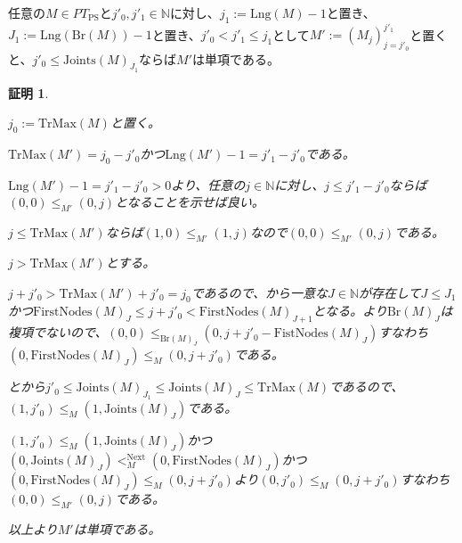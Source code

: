\documentclass[dvipdfmx,uplatex]{jsarticle}
\theoremstyle{customnonumberbreakfortheorem}
\theoremstyle{customnonumberbreakforproof}
\newtheorem{hideableproof}{証明}
\begin{document}
\begin{corollary}[単項性の切片への遺伝性]\label{単項性の切片への遺伝性}
	任意の\(M \in PT_{\textrm{PS}}\)と\(j'_0,j'_1 \in \mathbb{N}\)に対し、\(j_1 := \textrm{Lng}(M)-1\)と置き、\(J_1 := \textrm{Lng}(\textrm{Br}(M))-1\)と置き、\(j'_0 < j'_1 \leq j_1\)として\(M' := (M_j)_{j=j'_0}^{j'_1}\)と置くと、\(j'_0 \leq \textrm{Joints}(M)_{J_1}\)ならば\(M'\)は単項である。
\end{corollary}

\begin{hideableproof}
	\begin{indented}
		\item \(j_0 := \textrm{TrMax}(M)\)と置く。
		\item \(\textrm{TrMax}(M') = j_0-j'_0\)かつ\(\textrm{Lng}(M')-1 = j'_1-j'_0\)である。
		\item \(\textrm{Lng}(M')-1 = j'_1-j'_0 > 0\)より、任意の\(j \in \mathbb{N}\)に対し、\(j \leq j'_1-j'_0\)ならば\((0,0) \leq_{M'} (0,j)\)となることを示せば良い。
		\item \(j \leq \textrm{TrMax}(M')\)ならば\((1,0) \leq_{M'} (1,j)\)なので\((0,0) \leq_{M'} (0,j)\)である。
		\item \(j > \textrm{TrMax}(M')\)とする。
		\begin{indented}
			\item \(j+j'_0 > \textrm{TrMax}(M')+j'_0 = j_0\)であるので、から一意な\(J \in \mathbb{N}\)が存在して\(J \leq J_1\)かつ\(\textrm{FirstNodes}(M)_J \leq j+j'_0 < \textrm{FirstNodes}(M)_{J+1}\)となる。より\(\textrm{Br}(M)_J\)は複項でないので、\((0,0) \leq_{\textrm{Br}(M)_J} (0,j+j'_0 - \textrm{FistNodes}(M)_J)\)すなわち\((0,\textrm{FirstNodes}(M)_J) \leq_M (0,j+j'_0)\)である。
			\item {}とから\(j'_0 \leq \textrm{Joints}(M)_{J_1} \leq \textrm{Joints}(M)_J \leq \textrm{TrMax}(M)\)であるので、\((1,j'_0) \leq_M (1,\textrm{Joints}(M)_J)\)である。
			\item \((1,j'_0) \leq_M (1,\textrm{Joints}(M)_J)\)かつ\((0,\textrm{Joints}(M)_J) <_M^{\textrm{Next}} (0,\textrm{FirstNodes}(M)_J)\)かつ\((0,\textrm{FirstNodes}(M)_J) \leq_M (0,j+j'_0)\)より\((0,j'_0) \leq_M (0,j+j'_0)\)すなわち\((0,0) \leq_{M'} (0,j)\)である。
		\end{indented}
		\item 以上より\(M'\)は単項である。
	\end{indented}
\end{hideableproof}
\end{document}
